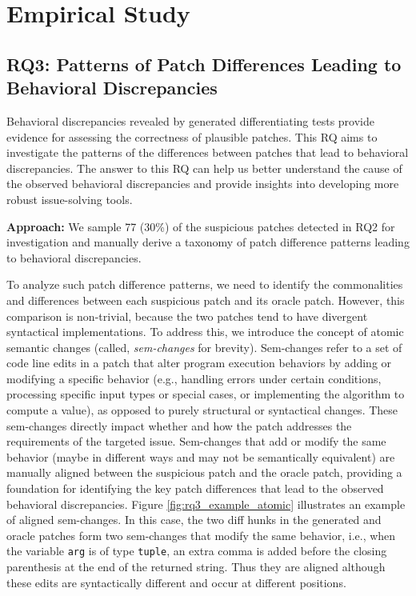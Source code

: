 \section{Empirical Study}







\subsection{RQ3: Patterns of Patch Differences Leading to Behavioral Discrepancies}
Behavioral discrepancies revealed by generated differentiating tests provide evidence for assessing the correctness of plausible patches.
%
This RQ aims to investigate the patterns of the differences between patches that lead to behavioral discrepancies.
The answer to this RQ can help us better understand the cause of the observed behavioral discrepancies and 
provide insights into developing more robust issue-solving tools. 

\noindent \textbf{Approach:}
We sample 77 (30\%) of the suspicious patches detected in RQ2 for investigation and manually derive a taxonomy of patch difference patterns leading to behavioral discrepancies.
%

To analyze such patch difference patterns, we need to identify the commonalities and differences between each suspicious patch and its oracle patch.
However, this comparison is non-trivial, because the two patches tend to have divergent syntactical implementations.
To address this, we introduce the concept of atomic semantic changes (called, \emph{sem-changes} for brevity).
Sem-changes refer to a set of code line edits in a patch that alter program execution behaviors by adding or modifying a specific behavior
(e.g., handling errors under certain conditions, processing specific input types or special cases, or implementing the algorithm to compute a value), 
as opposed to purely structural or syntactical changes. 
These sem-changes directly impact whether and how the patch addresses the requirements of the targeted issue. 
Sem-changes that add or modify the same behavior (maybe in different ways and may not be semantically equivalent) are manually aligned between the suspicious patch and the oracle patch, providing a foundation for identifying the key patch differences that lead to the observed behavioral discrepancies. 
Figure \ref{fig:rq3_example_atomic} illustrates an example of aligned sem-changes. 
In this case, the two diff hunks in the generated and oracle patches form two sem-changes that modify the same behavior, i.e., when the variable \verb|arg| is of type \verb|tuple|, an extra comma is added before the closing parenthesis at the end of the returned string. 
Thus they are aligned although these edits are syntactically different and occur at different positions.


